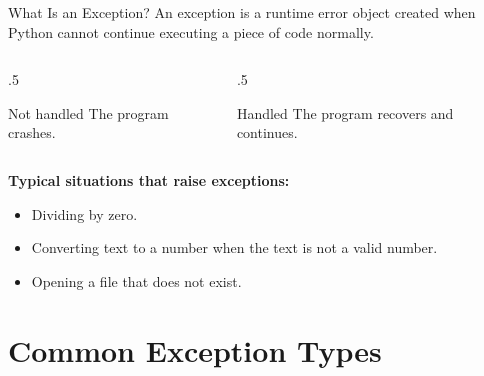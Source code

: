 \documentclass[9pt,aspectratio=169,xcolor=table]{beamer}
\begin{document}
\begin{frame}{What Is an Exception?}
    \leavevmode
    An exception is a runtime error object created when Python cannot
    continue executing a piece of code normally.

    \vspace{2mm}
    \begin{columns}[t]
        \begin{column}{.5\textwidth}
            \begin{block}{Not handled}
                \small The program \alert{crashes}.
            \end{block}
        \end{column}
        \begin{column}{.5\textwidth}
            \begin{block}{Handled}
                \small The program \alert{recovers and continues}.
            \end{block}
        \end{column}
    \end{columns}

    \vspace{3mm}
    \textbf{Typical situations that raise exceptions:}
    \begin{itemize}
        \item Dividing by zero.
        \item Converting text to a number when the text is not a valid
              number.
        \item Opening a file that does not exist.
    \end{itemize}
\end{frame}

\section{Common Exception Types}
\end{document}
